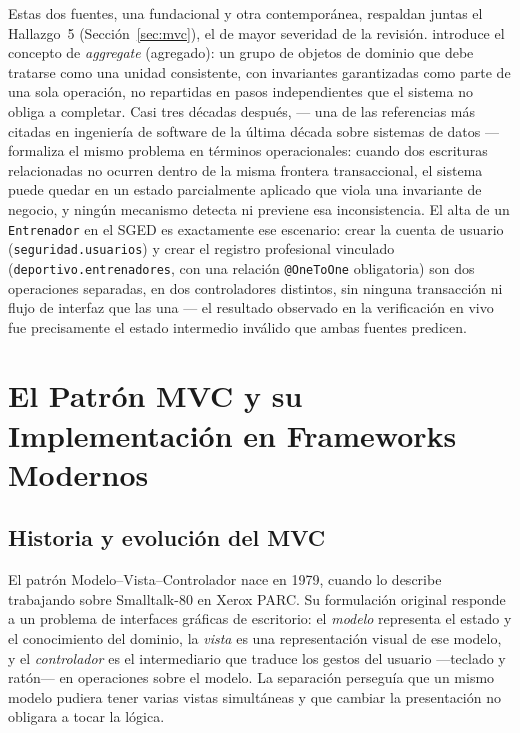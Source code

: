 \documentclass[12pt,a4paper]{article}
\begin{document}
Estas dos fuentes, una fundacional y otra contemporánea, respaldan juntas el Hallazgo~5
(Sección~\ref{sec:mvc}), el de mayor severidad de la revisión. \textcite{evans2003} introduce
el concepto de \textit{aggregate} (agregado): un grupo de objetos de dominio que debe tratarse
como una unidad consistente, con invariantes garantizadas como parte de una sola operación, no
repartidas en pasos independientes que el sistema no obliga a completar. Casi tres décadas
después, \textcite{kleppmann2017} --- una de las referencias más citadas en ingeniería de
software de la última década sobre sistemas de datos --- formaliza el mismo problema en
términos operacionales: cuando dos escrituras relacionadas no ocurren dentro de la misma
frontera transaccional, el sistema puede quedar en un estado parcialmente aplicado que viola
una invariante de negocio, y ningún mecanismo detecta ni previene esa inconsistencia. El alta
de un \texttt{Entrenador} en el SGED es exactamente ese escenario: crear la cuenta de usuario
(\texttt{seguridad.usuarios}) y crear el registro profesional vinculado
(\texttt{deportivo.entrenadores}, con una relación \texttt{@OneToOne} obligatoria) son dos
operaciones separadas, en dos controladores distintos, sin ninguna transacción ni flujo de
interfaz que las una --- el resultado observado en la verificación en vivo fue precisamente el
estado intermedio inválido que ambas fuentes predicen.

\section{El Patrón MVC y su Implementación en Frameworks Modernos}
\label{sec:mvc-teoria}

\subsection{Historia y evolución del MVC}

El patrón Modelo--Vista--Controlador nace en 1979, cuando \textcite{reenskaug1979} lo describe
trabajando sobre Smalltalk-80 en Xerox PARC. Su formulación original responde a un problema de
interfaces gráficas de escritorio: el \textit{modelo} representa el estado y el conocimiento del
dominio, la \textit{vista} es una representación visual de ese modelo, y el \textit{controlador}
es el intermediario que traduce los gestos del usuario ---teclado y ratón--- en operaciones sobre
el modelo. La separación perseguía que un mismo modelo pudiera tener varias vistas simultáneas y
que cambiar la presentación no obligara a tocar la lógica.
\end{document}
